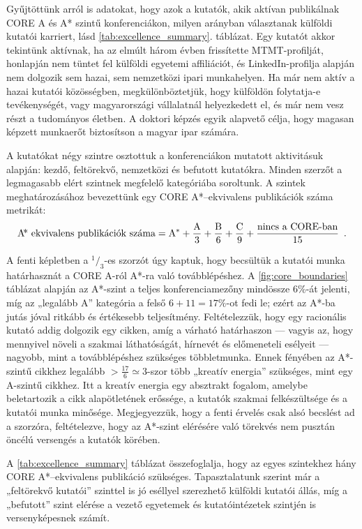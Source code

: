 \documentclass[12pt,a4paper]{article}
\newcommand{\hh}[1]{${}^{\!1}\!/_{#1}$}
\begin{document}
Gyűjtöttünk arról is adatokat, hogy azok a kutatók, akik aktívan publikálnak CORE A és A\!* szintű konferenciákon, milyen arányban választanak külföldi kutatói karriert, lásd \ref{tab:excellence_summary}. táblázat.
Egy kutatót akkor tekintünk aktívnak, ha az elmúlt három évben frissítette MTMT-profilját, honlapján nem tüntet fel külföldi egyetemi affiliációt, és LinkedIn-profilja alapján nem dolgozik sem hazai, sem nemzetközi ipari munkahelyen. Ha már nem aktív a hazai kutatói közösségben, megkülönböztetjük, hogy külföldön folytatja-e tevékenységét, vagy magyarországi vállalatnál helyezkedett el, és már nem vesz részt a tudományos életben. A doktori képzés egyik alapvető célja, hogy magasan képzett munkaerőt biztosítson a magyar ipar számára.

A kutatókat négy szintre osztottuk a konferenciákon mutatott aktivitásuk alapján: kezdő, feltörekvő, nemzetközi és befutott kutatókra. Minden szerzőt a legmagasabb elért szintnek megfelelő kategóriába soroltunk. A szintek meghatározásához bevezettünk egy CORE A\!*–ekvivalens publikációk száma metrikát:
\begin{equation}
\textrm{A\!*\ ekvivalens\ publikációk\ száma} = \mathrm{A^*} + \frac{\mathrm{A}}{3} + \frac{\mathrm{B}}{6} + \frac{\mathrm{C}}{9} + \frac{\textrm{nincs\ a\ CORE-ban}}{15} \enspace .
\label{eq:weights1}
\end{equation}

A fenti képletben a \hh{3}-es szorzót úgy kaptuk, hogy becsültük a kutatói munka határhasznát a CORE A-ról A\!*-ra való továbblépéshez. A \ref{fig:core_boundaries} táblázat alapján az A\!*-szint a teljes konferenciamezőny mindössze 6\%-át jelenti, míg az „legalább A” kategória a felső $6+11=17\%$-ot fedi le; ezért az A\!*-ba jutás jóval ritkább és értékesebb teljesítmény. Feltételezzük, hogy egy racionális kutató addig dolgozik egy cikken, amíg a várható határhaszon — vagyis az, hogy mennyivel növeli a szakmai láthatóságát, hírnevét és előmeneteli esélyeit — nagyobb, mint a továbblépéshez szükséges többletmunka. Ennek fényében az A\!*-szintű cikkhez legalább $> \frac{17}{6} \simeq 3$-szor több „kreatív energia” szükséges, mint egy A-szintű cikkhez. Itt a kreatív energia egy absztrakt fogalom, amelybe beletartozik a cikk alapötletének erőssége, a kutatók szakmai felkészültsége és a kutatói munka minősége. Megjegyezzük, hogy a fenti érvelés csak alsó becslést ad a szorzóra, feltételezve, hogy az A\!*-szint elérésére való törekvés nem pusztán öncélú versengés a kutatók körében.

 A \ref{tab:excellence_summary} táblázat összefoglalja, hogy az egyes szintekhez hány CORE A\!*–ekvivalens publikáció szükséges. Tapasztalatunk szerint már a „feltörekvő kutatói” szinttel is jó eséllyel szerezhető külföldi kutatói állás, míg a „befutott” szint elérése a vezető egyetemek és kutatóintézetek szintjén is versenyképesnek számít.
\end{document}
